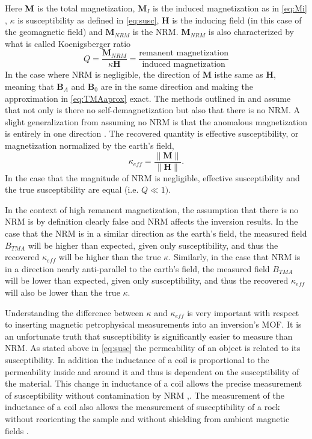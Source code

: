 Here $\textbf M$ is the total magnetization, $\mathbf M_I$ is the induced magnetization as in \autoref{eq:Mi} , $\kappa$ is susceptibility as defined in \autoref{eq:susc}, $\textbf{H}$ is the inducing field (in this case of the geomagnetic field) and $\textbf{M}_{NRM}$ is the \ac{NRM}. $\textbf{M}_{NRM}$  is also characterized by what is called Koenigsberger ratio
\begin{equation} \label{eq:Koenigsberger}
Q = \frac{\textbf{M}_{NRM}}{ \kappa\textbf{H}} = \frac{\text{remanent magnetization}}{\text{induced magnetization}}
\end{equation}
In the case where \ac{NRM} is negligible, the direction of $\mathbf M$ isthe same as $\mathbf H$, meaning that $\mathbf B_A$ and $\mathbf B_0$ are in the same direction and making the approximation in \autoref{eq:TMAaprox} exact. The methods outlined in \cite{li19963} and \cite{pilkington19973} assume that not only is there no self-demagnetization but also that there is no \ac{NRM}. A slight generalization from assuming no \ac{NRM} is that the anomalous magnetization is entirely in one direction \cite{li19963}. The recovered quantity is effective susceptibility, or magnetization normalized by the earth's field,
\begin{equation} \label{eq:effSusc}
\kappa_{eff} =  \frac{\|\mathbf M\|}{\|\mathbf H\|}.
\end{equation}In the case that the magnitude of \ac{NRM} is negligible, effective susceptibility and the true susceptibility are equal (i.e. $Q \ll 1)$.

	In the context of high remanent magnetization, the assumption that there is no \ac{NRM} is by definition clearly false and \ac{NRM} affects the inversion results. In the case that the \ac{NRM} is in a similar direction as the earth's field, the measured field $B_{TMA}$ will be higher than expected, given only susceptibility, and thus the recovered $\kappa_{eff}$ will be higher than the true $\kappa$. Similarly, in the case that \ac{NRM} is in a direction nearly anti-parallel to the earth's field, the measured field $B_{TMA}$ will be lower than expected, given only susceptibility, and thus the recovered $\kappa_{eff}$ will also be lower than the true $\kappa$.
	
	Understanding the difference between $\kappa$ and $\kappa_{eff}$ is very important with respect to inserting magnetic petrophysical measurements into an inversion's \ac{MOF}. It is an unfortunate truth that susceptibility is significantly easier to measure than \ac{NRM}. As stated above in \autoref{eq:susc} the permeability of an object is related to its susceptibility. In addition the inductance of a coil is proportional to the permeability inside and around it and thus is dependent on the susceptibility of the material. This change in inductance of a coil allows the precise measurement of susceptibility without contamination by \ac{NRM} \cite{collinson1983methods},\cite{clark1991notes}. The measurement of the inductance of a coil also allows the measurement of susceptibility of a rock without reorienting the sample and without shielding from ambient magnetic fields \cite{collinson1983methods}.
	
